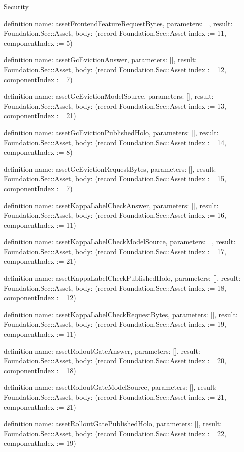\begin{lexlean}{Security}
\begin{semanticmodule}
definition{
  name: assetFrontendFeatureRequestBytes,
  parameters: [],
  result: Foundation.Sec::Asset,
  body: (record Foundation.Sec::Asset {index := 11, componentIndex := 5})
}

definition{
  name: assetGcEvictionAnswer,
  parameters: [],
  result: Foundation.Sec::Asset,
  body: (record Foundation.Sec::Asset {index := 12, componentIndex := 7})
}

definition{
  name: assetGcEvictionModelSource,
  parameters: [],
  result: Foundation.Sec::Asset,
  body: (record Foundation.Sec::Asset {index := 13, componentIndex := 21})
}

definition{
  name: assetGcEvictionPublishedHolo,
  parameters: [],
  result: Foundation.Sec::Asset,
  body: (record Foundation.Sec::Asset {index := 14, componentIndex := 8})
}

definition{
  name: assetGcEvictionRequestBytes,
  parameters: [],
  result: Foundation.Sec::Asset,
  body: (record Foundation.Sec::Asset {index := 15, componentIndex := 7})
}

definition{
  name: assetKappaLabelCheckAnswer,
  parameters: [],
  result: Foundation.Sec::Asset,
  body: (record Foundation.Sec::Asset {index := 16, componentIndex := 11})
}

definition{
  name: assetKappaLabelCheckModelSource,
  parameters: [],
  result: Foundation.Sec::Asset,
  body: (record Foundation.Sec::Asset {index := 17, componentIndex := 21})
}

definition{
  name: assetKappaLabelCheckPublishedHolo,
  parameters: [],
  result: Foundation.Sec::Asset,
  body: (record Foundation.Sec::Asset {index := 18, componentIndex := 12})
}

definition{
  name: assetKappaLabelCheckRequestBytes,
  parameters: [],
  result: Foundation.Sec::Asset,
  body: (record Foundation.Sec::Asset {index := 19, componentIndex := 11})
}

definition{
  name: assetRolloutGateAnswer,
  parameters: [],
  result: Foundation.Sec::Asset,
  body: (record Foundation.Sec::Asset {index := 20, componentIndex := 18})
}

definition{
  name: assetRolloutGateModelSource,
  parameters: [],
  result: Foundation.Sec::Asset,
  body: (record Foundation.Sec::Asset {index := 21, componentIndex := 21})
}

definition{
  name: assetRolloutGatePublishedHolo,
  parameters: [],
  result: Foundation.Sec::Asset,
  body: (record Foundation.Sec::Asset {index := 22, componentIndex := 19})
}


\end{semanticmodule}
\end{lexlean}
